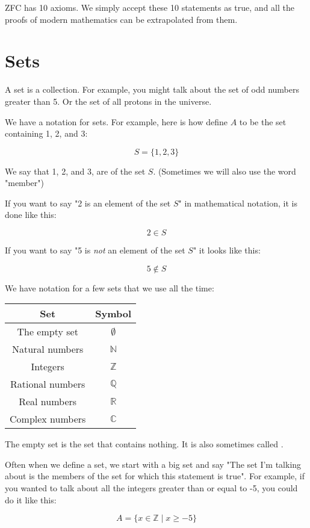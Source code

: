 ZFC has 10 axioms.  We simply accept these 10 statements as true, and
all the proofs of modern mathematics can be extrapolated from them.

\section{Sets}

A set is a collection.  For example, you might talk about the set of
odd numbers greater than 5.  Or the set of all protons in the
universe.  

We have a notation for sets.  For example, here is how define $A$ to
be the set containing 1, 2, and 3:

$$S = \{1, 2, 3\}$$

We say that 1, 2, and 3, are  of the set $S$.
(Sometimes we will also use the word "member")

If you want to say "2 is an element of the set $S$" in mathematical
notation, it is done like this:

$$ 2 \in S$$

If you want to say "5 is \textit{not} an element of the set $S$" it
looks like this:

$$ 5 \notin S$$

We have notation for a few sets that we use all the time:

\begin{tabular}{c|c}
Set & Symbol \\
\hline
The empty set & $\emptyset$ \\
Natural numbers & $\mathbb{N}$ \\
Integers & $\mathbb{Z}$ \\
Rational numbers & $\mathbb{Q}$ \\
Real numbers & $\mathbb{R}$ \\
Complex numbers & $\mathbb{C}$ \\
\end{tabular}

The empty set is the set that contains nothing.  It is also sometimes
called .

Often when we define a set, we start with a big set and say "The set
I'm talking about is the members of the set for which this statement
is true".  For example, if you wanted to talk about all the integers
greater than or equal to -5, you could do it like this:

$$A = \{ x \in \mathbb{Z} \mid x \geq -5 \}$$

